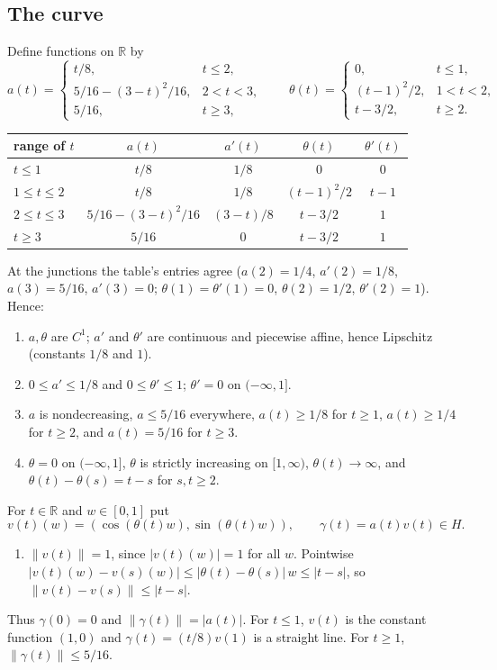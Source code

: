 \documentclass[11pt]{article}
\newcommand{\R}{\mathbb R}
\newcommand{\norm}[1]{\lVert #1\rVert}
\theoremstyle{definition}
\numberwithin{equation}{section}
\begin{document}
\subsection{The curve}

Define functions on \(\R\) by
\[
 a(t)=
 \begin{cases}
 t/8,&t\le2,\\
 5/16-(3-t)^2/16,&2<t<3,\\
 5/16,&t\ge3,
 \end{cases}
 \qquad
 \theta(t)=
 \begin{cases}
 0,&t\le1,\\
 (t-1)^2/2,&1<t<2,\\
 t-3/2,&t\ge2.
 \end{cases}
\]
\begin{center}
\begin{tabular}{@{}lcccc@{}}
\toprule
range of \(t\) & \(a(t)\) & \(a'(t)\) & \(\theta(t)\) & \(\theta'(t)\)\\
\midrule
\(t\le1\) & \(t/8\) & \(1/8\) & \(0\) & \(0\)\\
\(1\le t\le2\) & \(t/8\) & \(1/8\) & \((t-1)^2/2\) & \(t-1\)\\
\(2\le t\le3\) & \(5/16-(3-t)^2/16\) & \((3-t)/8\) & \(t-3/2\) & \(1\)\\
\(t\ge3\) & \(5/16\) & \(0\) & \(t-3/2\) & \(1\)\\
\bottomrule
\end{tabular}
\end{center}
At the junctions the table's entries agree
(\(a(2)=1/4\), \(a'(2)=1/8\), \(a(3)=5/16\), \(a'(3)=0\);
\(\theta(1)=\theta'(1)=0\), \(\theta(2)=1/2\), \(\theta'(2)=1\)). Hence:
\begin{enumerate}[label=(F\arabic*)]
\item \(a,\theta\) are \(C^1\); \(a'\) and \(\theta'\) are continuous and
piecewise affine, hence Lipschitz (constants \(1/8\) and \(1\)).
\item \(0\le a'\le1/8\) and \(0\le\theta'\le1\); \(\theta'=0\) on
\((-\infty,1]\).
\item \(a\) is nondecreasing, \(a\le5/16\) everywhere, \(a(t)\ge1/8\) for
\(t\ge1\), \(a(t)\ge1/4\) for \(t\ge2\), and \(a(t)=5/16\) for \(t\ge3\).
\item \(\theta=0\) on \((-\infty,1]\), \(\theta\) is strictly increasing
on \([1,\infty)\), \(\theta(t)\to\infty\), and
\(\theta(t)-\theta(s)=t-s\) for \(s,t\ge2\).
\end{enumerate}
For \(t\in\R\) and \(w\in[0,1]\) put
\[
 v(t)(w)=(\cos(\theta(t)w),\sin(\theta(t)w)),
 \qquad \gamma(t)=a(t)v(t)\in H .
\]
\begin{enumerate}[label=(F\arabic*),resume]
\item \(\norm{v(t)}=1\), since \(|v(t)(w)|=1\) for all \(w\). Pointwise
\(|v(t)(w)-v(s)(w)|\le|\theta(t)-\theta(s)|\,w\le|t-s|\), so
\(\norm{v(t)-v(s)}\le|t-s|\).
\end{enumerate}
Thus \(\gamma(0)=0\) and \(\norm{\gamma(t)}=|a(t)|\). For \(t\le1\),
\(v(t)\) is the constant function \((1,0)\) and \(\gamma(t)=(t/8)v(1)\)
is a straight line. For \(t\ge1\), \(\norm{\gamma(t)}\le5/16\).
\end{document}
